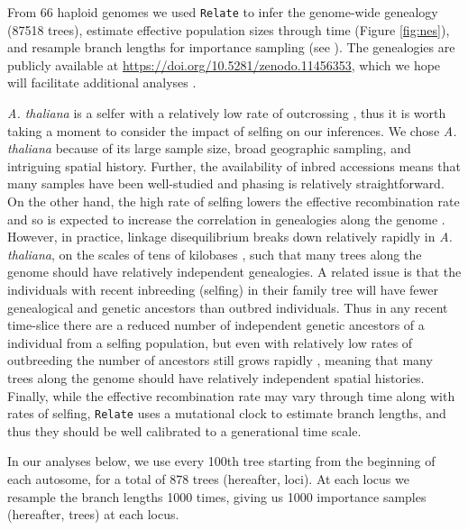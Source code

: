 \documentclass[12pt]{article}
\begin{document}
From 66 haploid genomes we used \texttt{Relate} \citep{speidel2019method} to infer the genome-wide genealogy (87518 trees), estimate effective population sizes through time (Figure \ref{fig:nes}), and resample branch lengths for importance sampling (see ).
The genealogies are publicly available at \url{https://doi.org/10.5281/zenodo.11456353}, which we hope will facilitate additional analyses \citep[e.g., inferring selection;][]{stern2019approximate,stern2020disentangling}.

\textit{A. thaliana} is a selfer with a relatively low rate of outcrossing \citep{bomblies2010local,platt2010scale}, thus it is worth taking a moment to consider the impact of selfing on our inferences. 
We chose \textit{A. thaliana} because of its large sample size, broad geographic sampling, and intriguing spatial history.
Further, the availability of inbred accessions means that many samples have been well-studied 
and phasing is relatively straightforward. 
On the other hand, the high rate of selfing lowers the effective recombination rate and so is expected to increase the correlation in genealogies along the genome \citep{nordborg2000linkage}. 
However, in practice, linkage disequilibrium breaks down relatively rapidly in \textit{A. thaliana}, on the scales of tens of kilobases \citep{kim2007recombination}, such that many trees along the genome should have relatively independent genealogies. 
A related issue is that the individuals with recent inbreeding (selfing) in their family tree will have fewer genealogical and genetic ancestors than outbred individuals. 
Thus in any recent time-slice there are a reduced number of independent genetic ancestors of a individual from a selfing population, but even with relatively low rates of outbreeding the number of ancestors still grows rapidly \citep{lachance2009inbreeding}, meaning that many trees along the genome should have relatively independent spatial histories. 
Finally, while the effective recombination rate may vary through time along with rates of selfing, \texttt{Relate} uses a mutational clock to estimate branch lengths, and thus they should be well calibrated to a generational time scale.

In our analyses below, we use every 100th tree starting from the beginning of each autosome, for a total of 878 trees (hereafter, loci).
At each locus we resample the branch lengths 1000 times, giving us 1000 importance samples (hereafter, trees) at each locus.

\end{document}
